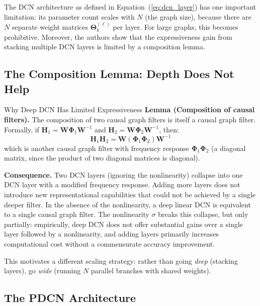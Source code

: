 The DCN architecture as defined in Equation~(\ref{eq:dcn_layer}) has one
important limitation: its parameter count scales with $N$ (the graph size),
because there are $N$ separate weight matrices $\boldsymbol{\Theta}_k^{(\ell)}$
per layer. For large graphs, this becomes prohibitive. Moreover, the authors
show that the expressiveness gain from stacking multiple DCN layers is limited
by a composition lemma.

\subsection{The Composition Lemma: Depth Does Not Help}

\begin{conceptbox}{Why Deep DCN Has Limited Expressiveness}
\textbf{Lemma (Composition of causal filters).}
The composition of two causal graph filters is itself a causal graph filter.
Formally, if $\mathbf{H}_1 = \mathbf{W}\boldsymbol{\Phi}_1\mathbf{W}^{-1}$ and
$\mathbf{H}_2 = \mathbf{W}\boldsymbol{\Phi}_2\mathbf{W}^{-1}$, then:
\[
    \mathbf{H}_1 \mathbf{H}_2 = \mathbf{W}(\boldsymbol{\Phi}_1\boldsymbol{\Phi}_2)\mathbf{W}^{-1}
\]
which is another causal graph filter with frequency response
$\boldsymbol{\Phi}_1\boldsymbol{\Phi}_2$ (a diagonal matrix, since the product
of two diagonal matrices is diagonal).

\medskip
\textbf{Consequence.} Two DCN layers (ignoring the nonlinearity) collapse into
one DCN layer with a modified frequency response. Adding more layers does not
introduce new representational capabilities that could not be achieved by a
single deeper filter. In the absence of the nonlinearity, a deep linear DCN is
equivalent to a single causal graph filter. The nonlinearity $\sigma$ breaks
this collapse, but only partially: empirically, deep DCN does not offer
substantial gains over a single layer followed by a nonlinearity, and adding
layers primarily increases computational cost without a commensurate accuracy
improvement.
\end{conceptbox}

This motivates a different scaling strategy: rather than going \emph{deep}
(stacking layers), go \emph{wide} (running $N$ parallel branches with shared
weights).

\subsection{The PDCN Architecture}

